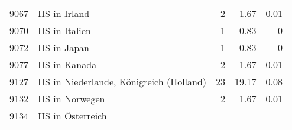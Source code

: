 \begin{longtable}{lXrrr}
     9067 &
     \multicolumn{1}{X}{ HS in Irland   } &


       \num{2} &
       \num[round-mode=places,round-precision=2]{1.67} &
         \num[round-mode=places,round-precision=2]{0.01} \\

     9070 &
     \multicolumn{1}{X}{ HS in Italien   } &


       \num{1} &
       \num[round-mode=places,round-precision=2]{0.83} &
         \num[round-mode=places,round-precision=2]{0} \\

     9072 &
     \multicolumn{1}{X}{ HS in Japan   } &


       \num{1} &
       \num[round-mode=places,round-precision=2]{0.83} &
         \num[round-mode=places,round-precision=2]{0} \\

     9077 &
     \multicolumn{1}{X}{ HS in Kanada   } &


       \num{2} &
       \num[round-mode=places,round-precision=2]{1.67} &
         \num[round-mode=places,round-precision=2]{0.01} \\

     9127 &
     \multicolumn{1}{X}{ HS in Niederlande, Königreich (Holland)   } &


       \num{23} &
       \num[round-mode=places,round-precision=2]{19.17} &
         \num[round-mode=places,round-precision=2]{0.08} \\

     9132 &
     \multicolumn{1}{X}{ HS in Norwegen   } &


       \num{2} &
       \num[round-mode=places,round-precision=2]{1.67} &
         \num[round-mode=places,round-precision=2]{0.01} \\

     9134 &
     \multicolumn{1}{X}{ HS in Österreich   } &



\end{longtable}
